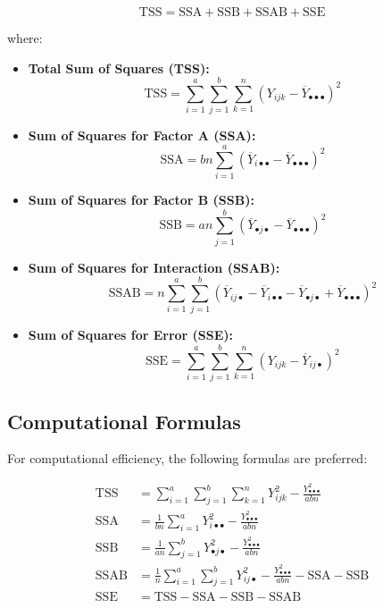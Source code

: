 \documentclass[twoside]{book}
\begin{document}
\begin{textbox}
\begin{equation*}
\text{TSS} = \text{SSA} + \text{SSB} + \text{SSAB} + \text{SSE}
\end{equation*}
\end{textbox}

where:
\begin{itemize}
\item \textbf{Total Sum of Squares (TSS):}
\[
\text{TSS} = \sum_{i=1}^a \sum_{j=1}^b \sum_{k=1}^n (Y_{ijk} - \overline{Y}_{\bullet\bullet\bullet})^2
\]

\item \textbf{Sum of Squares for Factor A (SSA):}
\[
\text{SSA} = bn\sum_{i=1}^a (\overline{Y}_{i\bullet\bullet} - \overline{Y}_{\bullet\bullet\bullet})^2
\]

\item \textbf{Sum of Squares for Factor B (SSB):}
\[
\text{SSB} = an\sum_{j=1}^b (\overline{Y}_{\bullet j\bullet} - \overline{Y}_{\bullet\bullet\bullet})^2
\]

\item \textbf{Sum of Squares for Interaction (SSAB):}
\[
\text{SSAB} = n\sum_{i=1}^a \sum_{j=1}^b (\overline{Y}_{ij\bullet} - \overline{Y}_{i\bullet\bullet} - \overline{Y}_{\bullet j\bullet} + \overline{Y}_{\bullet\bullet\bullet})^2
\]

\item \textbf{Sum of Squares for Error (SSE):}
\[
\text{SSE} = \sum_{i=1}^a \sum_{j=1}^b \sum_{k=1}^n (Y_{ijk} - \overline{Y}_{ij\bullet})^2
\]
\end{itemize}

\subsection{Computational Formulas}

For computational efficiency, the following formulas are preferred:

\begin{textbox}
\begin{align*}
\text{TSS} &= \sum_{i=1}^a \sum_{j=1}^b \sum_{k=1}^n Y_{ijk}^2 - \frac{Y_{\bullet\bullet\bullet}^2}{abn} \\[0.5em]
\text{SSA} &= \frac{1}{bn}\sum_{i=1}^a Y_{i\bullet\bullet}^2 - \frac{Y_{\bullet\bullet\bullet}^2}{abn} \\[0.5em]
\text{SSB} &= \frac{1}{an}\sum_{j=1}^b Y_{\bullet j\bullet}^2 - \frac{Y_{\bullet\bullet\bullet}^2}{abn} \\[0.5em]
\text{SSAB} &= \frac{1}{n}\sum_{i=1}^a \sum_{j=1}^b Y_{ij\bullet}^2 - \frac{Y_{\bullet\bullet\bullet}^2}{abn} - \text{SSA} - \text{SSB} \\[0.5em]
\text{SSE} &= \text{TSS} - \text{SSA} - \text{SSB} - \text{SSAB}
\end{align*}
\end{textbox}
\end{document}
